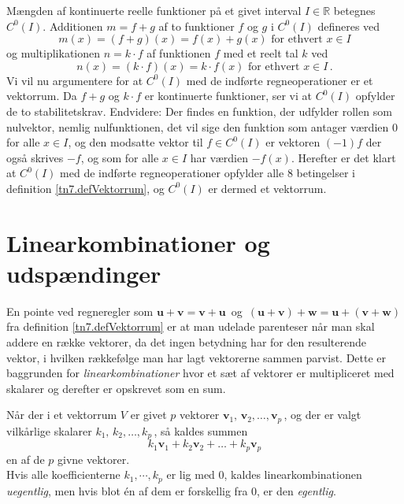\begin{example}\label{tn6.funk}
Mængden af kontinuerte reelle funktioner på et givet interval $I \in \mathbb R$ betegnes $C^0(I)$. Additionen $m=f+g$ af to funktioner $f$ og $g$ i  $C^0(I)$ defineres ved
$$
m(x)=(f+g)(x)=f(x)+g(x)\,\,\mathrm{for} \,\,\mathrm{ethvert} \,\,x\in I
$$
og multiplikationen $n=k\cdot f$ af funktionen $f$ med et reelt tal $k$ ved
$$
n(x)=(k\cdot f)(x)=k\cdot f(x)\,\,\mathrm{for} \,\,\mathrm{ethvert} \,\,x\in I\,.
$$
Vi vil nu argumentere for at $C^0(I)$ med de indførte regneoperationer er et vektorrum. Da $f+g$ og $k\cdot f$ er kontinuerte funktioner, ser vi at $C^0(I)$ opfylder de to stabilitetskrav. Endvidere: Der findes en funktion, der udfylder rollen som nulvektor, nemlig nulfunktionen, det vil sige den funktion som antager værdien 0 for alle $x\in I$, og den modsatte vektor til $f \in C^0(I)$ er vektoren $(-1)f$ der også skrives $-f$, og som for alle $x\in I$ har værdien $-f(x)$. Herefter er det klart at $C^0(I)$ med de indførte regneoperationer opfylder alle 8 betingelser i definition \ref{tn7.defVektorrum}, og $C^0(I)$ er dermed et vektorrum.
\end{example}

\section{Linearkombinationer og udspændinger}
En pointe ved regneregler som $ \mathbf u + \mathbf v = \mathbf v + \mathbf u \,$ og
$\, (\mathbf u + \mathbf v ) + \mathbf w = \mathbf u + (\mathbf v + \mathbf w)\, $ fra definition \ref{tn7.defVektorrum} er at man udelade parenteser når man skal addere en række vektorer, da det ingen betydning har for den resulterende vektor, i hvilken rækkefølge man har lagt vektorerne sammen parvist. Dette er baggrunden for \textit{linearkombinationer} hvor et sæt af vektorer er multipliceret med skalarer og derefter er opskrevet som en sum.

\begin{definition}[Linearkombination]\label{tn7.defLinkomb}
Når der i et vektorrum $V$ er givet $p$ vektorer ${\mathbf v}_1,\,{\mathbf v}_2,\ldots,{\mathbf v}_p\,$, og der er valgt vilkårlige skalarer $k_1,\,k_2,\ldots,k_p\,$, så kaldes summen
$$k_1{\mathbf v}_1+k_2{\mathbf v}_2+\ldots+k_p{\mathbf v}_p$$
en  af de $p$ givne vektorer.\\

Hvis alle koefficienterne $k_1,\cdots , k_p$ er lig med 0, kaldes linearkombinationen \textit{uegent\-lig}, men hvis blot én af dem er forskellig fra 0, er den \textit{egentlig}.
\end{definition}

